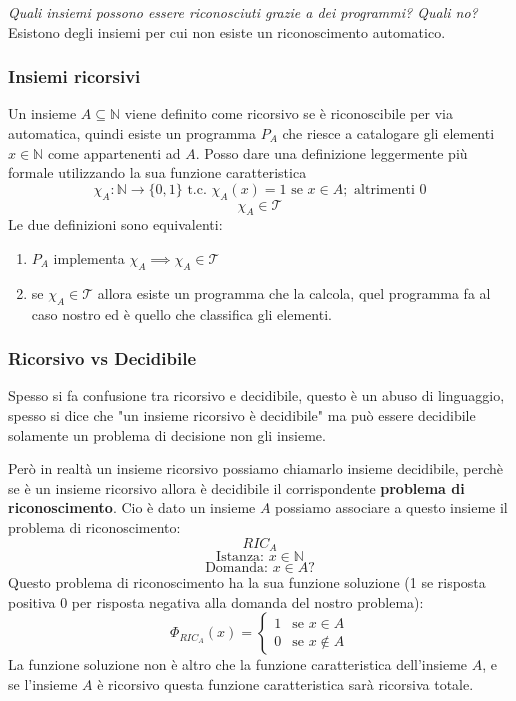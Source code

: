 \documentclass{article}
\begin{document}
\textit{Quali insiemi possono essere riconosciuti grazie a dei programmi? Quali no?} Esistono
degli insiemi per cui non esiste un riconoscimento automatico.

\subsubsection{Insiemi ricorsivi}
Un insieme $A\subseteq\mathbb{N}$ viene definito come ricorsivo se è riconoscibile per via automatica, quindi
esiste un programma $P_A$ che riesce a catalogare gli elementi $x\in\mathbb{N}$
come appartenenti ad $A$. Posso dare una definizione leggermente più formale utilizzando
la sua funzione caratteristica
$$\chi_A:\mathbb{N}\rightarrow\{0,1\}\text{ t.c. }\chi_A(x)=1\text{ se }x\in A;\text{ altrimenti }0$$
$$\chi_A\in\mathcal{T}$$
Le due definizioni sono equivalenti:
\begin{enumerate}
    \item $P_A$ implementa $\chi_A\implies \chi_A\in\mathcal{T}$
    \item se $\chi_A\in\mathcal{T}$ allora esiste un programma che la calcola,
          quel programma fa al caso nostro ed è quello che classifica gli elementi.
\end{enumerate}

\subsubsection{Ricorsivo vs Decidibile}
Spesso si fa confusione tra ricorsivo e decidibile, questo è un abuso di linguaggio,
spesso si dice che "un insieme ricorsivo è decidibile" ma può essere decidibile
solamente un problema di decisione non gli insieme.

Però in realtà un insieme ricorsivo
possiamo chiamarlo insieme decidibile, perchè se è un insieme ricorsivo allora è decidibile
il corrispondente \textbf{problema di riconoscimento}. Cio è dato un insieme $A$ possiamo
associare a questo insieme il problema di riconoscimento:
$$RIC_A$$
$$\text{Istanza: }x\in\mathbb{N}$$
$$\text{Domanda: }x\in A?$$
Questo problema di riconoscimento ha la sua funzione soluzione (1 se risposta
positiva 0 per risposta negativa alla domanda del nostro problema):
\[
    \Phi_{RIC_A}(x)=
    \begin{cases}
        1 & \text{se }x\in A    \\
        0 & \text{se }x\notin A
    \end{cases}
\]
La funzione soluzione non è altro che la funzione caratteristica dell'insieme $A$,
e se l'insieme $A$ è ricorsivo questa funzione caratteristica sarà ricorsiva totale.
\end{document}
